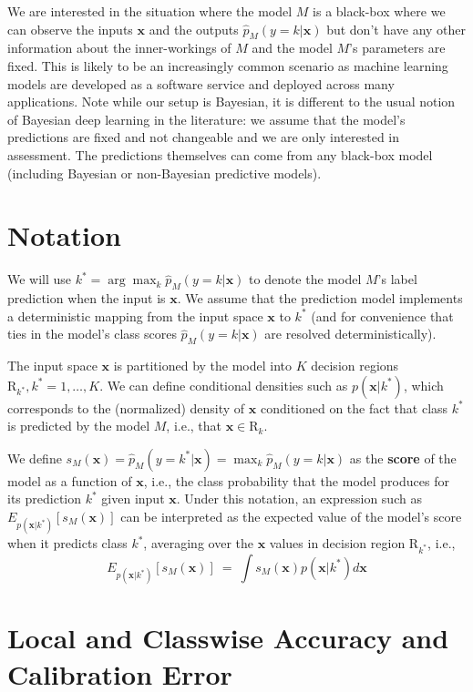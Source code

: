 \documentclass{article}
\newcommand{\ux}{{\mathbf{x}}}
\begin{document}
We are interested in the situation where the model $M$ is a black-box where we can observe the inputs $\ux$ and the outputs $\hat{p}_M(y = k | \ux)$ but don't have any other information about the inner-workings of $M$ and the model $M$'s parameters are fixed.
This is likely to be an increasingly common scenario as machine learning models are developed as a software service and deployed across many applications.
Note while our setup is Bayesian, it is different to the usual notion of Bayesian deep learning in the literature: we assume that the model's predictions are fixed and not changeable and we are only interested in assessment.
The predictions themselves can come from any black-box model (including Bayesian or non-Bayesian predictive models).


\section{Notation}

We will use $k^* = \arg \max_k \hat{p}_M(y = k | \ux)$ to denote the model $M$'s label prediction when the input is $\ux$.
We assume that the prediction model implements a deterministic mapping from the input space $\ux$ to $k^*$ (and for convenience that ties in the model's class scores $\hat{p}_M(y = k | \ux)$ are resolved deterministically).

The input space $\ux$ is partitioned by the model into $K$ decision regions $\mbox{R}_{k^*},  k^* = 1,\ldots,K$.
We can define conditional densities such as $p(\ux | k^*)$, which corresponds to the (normalized) density of $\ux$ conditioned on the fact that class $k^*$ is predicted by the model $M$, i.e., that $\ux \in \mbox{R}_k$.


We define $s_M(\ux) = \hat{p}_M(y = k^*| \ux) = \max_k \hat{p}_M(y = k | \ux)$ as the {\bf score} of the model as a function of $\ux$, i.e., the class probability that the model produces for its prediction $k^*$  given input $\ux$.
Under this notation, an expression such as $E_{p(\ux | k^*)}[s_M(\ux)]$ can be interpreted as the expected value of the model's score when it predicts class $k^*$, averaging over the $\ux$ values in decision region $\mbox{R}_{k^*}$, i.e.,
\[
    E_{p(\ux | k^*)}[s_M(\ux)] \ = \ \int s_M(\ux) p(\ux | k^*) d\ux
\]


\section{Local and Classwise Accuracy and Calibration Error}
\end{document}
